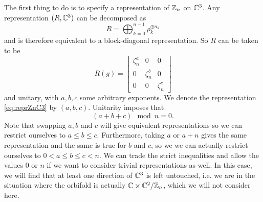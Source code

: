 \documentclass[a4paper,10pt]{article}
\begin{document}
            The first thing to do is to specify a representation of $\mathbb{Z}_n$ on $\mathbb{C}^3$. Any representation $(R,\mathbb{C}^3)$ can be decomposed as
            \begin{equation}
                R=\bigoplus^{n-1}_{k=0} \rho^{\oplus n_k}_k
            \end{equation}
            and is therefore equivalent to a block-diagonal representation. So $R$ can be taken to be
            \begin{equation}
                R(g)=
                \begin{bmatrix}
                    \zeta^a_n & 0 & 0 \\
                    0 & \zeta^b_n & 0 \\
                    0 & 0 & \zeta^c_n
                \end{bmatrix}\label{eq:reprZnC3}
            \end{equation}
            and unitary, with $a,b,c$ some arbitrary exponents. We denote the representation \eqref{eq:reprZnC3} by $(a,b,c)$.  Unitarity imposes that
            \begin{equation}
                (a+b+c)\mod n = 0.\label{eq:cdtabc}
            \end{equation}
            Note that swapping $a,b$ and $c$ will give equivalent representations so we can restrict ourselves to $a\leq b\leq c$. Furthermore, taking $a$ or $a+n$ gives the same representation and the same is true for $b$ and $c$, so we we can actually restrict ourselves to $0<a\leq b\leq c<n$. We can trade the strict inequalities and allow the values $0$ or $n$ if we want to consider trivial representations as well. In this case, we will find that at least one direction of $\mathbb{C}^3$ is left untouched, i.e. we are in the situation where the orbifold is actually $\mathbb{C}\times\mathbb{C}^2/\mathbb{Z}_n$, which we will not consider here.
\end{document}
